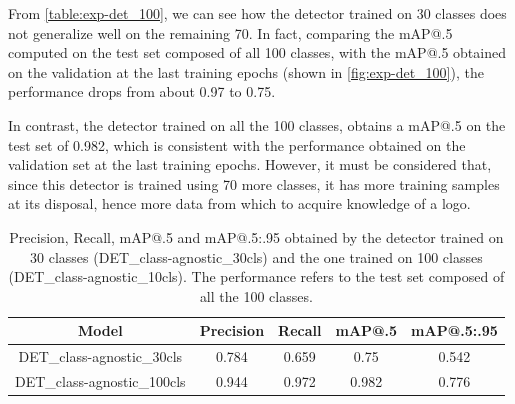 From \autoref{table:exp-det_100}, we can see how the detector trained on 30 classes does not generalize well on the remaining 70.
In fact, comparing the mAP@.5 computed on the test set composed of all 100 classes, with the mAP@.5 obtained on the validation at the last training epochs (shown in \autoref{fig:exp-det_100}), the performance drops from about 0.97 to 0.75.

In contrast, the detector trained on all the 100 classes, obtains a mAP@.5 on the test set of 0.982, which is consistent with the performance obtained on the validation set at the last training epochs.
However, it must be considered that, since this detector is trained using 70 more classes, it has more training samples at its disposal, hence more data from which to acquire knowledge of a logo.


\begin{table}[H]
    \centering
    \begin{tabular}{c|c|c|c|c}
        \hline
        \textbf{Model} &
        \textbf{Precision} &
        \textbf{Recall} &
        \textbf{mAP@.5} &
        \textbf{mAP@.5:.95} \\
        \hline
        \hline
DET\_class-agnostic\_30cls&0.784&0.659&0.75&0.542\\
DET\_class-agnostic\_100cls&0.944&0.972&0.982&0.776\\
\hline
\end{tabular}
\caption{Precision, Recall, mAP@.5 and mAP@.5:.95 obtained by the detector trained on 30 classes (DET\_class-agnostic\_30cls) and the one trained on 100 classes (DET\_class-agnostic\_10cls). The performance refers to the test set composed of all the 100 classes.}
    \label{table:exp-det_100}
\end{table}
\newpage


